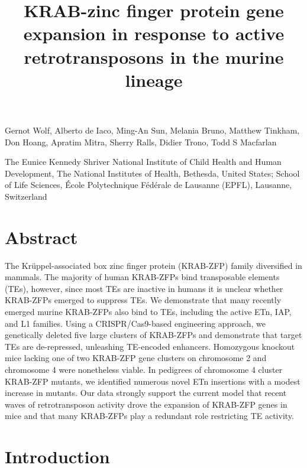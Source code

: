 \documentclass[11pt,a4paper]{article}
\title{KRAB-zinc finger protein gene expansion in response to active retrotransposons in the murine lineage}
\begin{document}
\maketitle

Gernot Wolf, Alberto de Iaco, Ming-An Sun, Melania Bruno, Matthew Tinkham, Don Hoang, Apratim Mitra, Sherry Ralls, Didier Trono, Todd S Macfarlan

The Eunice Kennedy Shriver National Institute of Child Health and Human Development, The National Institutes of Health, Bethesda, United States; School of Life Sciences, École Polytechnique Fédérale de Lausanne (EPFL), Lausanne, Switzerland

\section{Abstract}

The Krüppel-associated box zinc finger protein (KRAB-ZFP) family diversified in mammals. The majority of human KRAB-ZFPs bind transposable elements (TEs), however, since most TEs are inactive in humans it is unclear whether KRAB-ZFPs emerged to suppress TEs. We demonstrate that many recently emerged murine KRAB-ZFPs also bind to TEs, including the active ETn, IAP, and L1 families. Using a CRISPR/Cas9-based engineering approach, we genetically deleted five large clusters of KRAB-ZFPs and demonstrate that target TEs are de-repressed, unleashing TE-encoded enhancers. Homozygous knockout mice lacking one of two KRAB-ZFP gene clusters on chromosome 2 and chromosome 4 were nonetheless viable. In pedigrees of chromosome 4 cluster KRAB-ZFP mutants, we identified numerous novel ETn insertions with a modest increase in mutants. Our data strongly support the current model that recent waves of retrotransposon activity drove the expansion of KRAB-ZFP genes in mice and that many KRAB-ZFPs play a redundant role restricting TE activity.

\section{Introduction}
\end{document}
